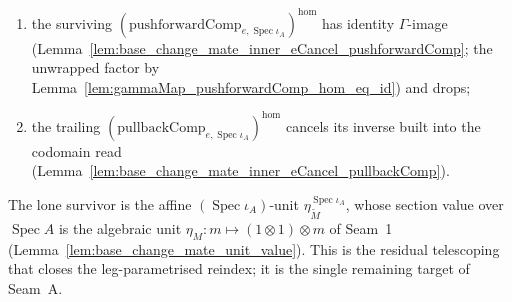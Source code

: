 \begin{lemma}
\begin{enumerate}
      (Lemma~\ref{lem:base_change_mate_inner_eCancel_eUnit}) and cancels the inverse \(e\)-unit
      built into the codomain read;
    \item the surviving
      \((\mathrm{pushforwardComp}_{e,\operatorname{Spec}\iota_A})^{\mathrm{hom}}\) has identity
      \(\Gamma\)-image (Lemma~\ref{lem:base_change_mate_inner_eCancel_pushforwardComp}; the
      unwrapped factor by Lemma~\ref{lem:gammaMap_pushforwardComp_hom_eq_id}) and drops;
    \item the trailing
      \((\mathrm{pullbackComp}_{e,\operatorname{Spec}\iota_A})^{\mathrm{hom}}\) cancels its inverse
      built into the codomain read
      (Lemma~\ref{lem:base_change_mate_inner_eCancel_pullbackComp}).
  \end{enumerate}
  The lone survivor is the affine \((\operatorname{Spec}\iota_A)\)-unit
  \(\eta^{\operatorname{Spec}\iota_A}_{\widetilde M}\), whose section value over
  \(\operatorname{Spec} A\) is the algebraic unit \(\eta_M : m \mapsto (1 \otimes 1) \otimes m\) of
  Seam~1 (Lemma~\ref{lem:base_change_mate_unit_value}). This is the residual telescoping that closes
  the leg-parametrised reindex; it is the single remaining target of Seam~A.
\end{lemma}
